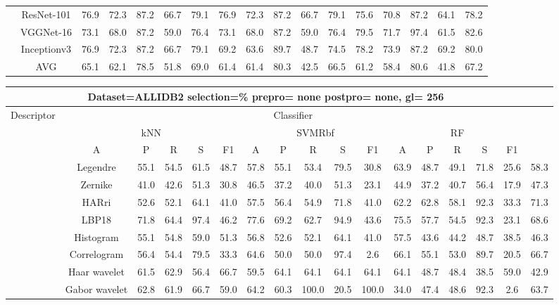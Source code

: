 \documentclass[12pt,italian]{article}
\begin{document}
\begin{tiny}
\begin{longtable}{lcccccccccccccccc}
& ResNet-101 & 76.9 & 72.3 & 87.2 & 66.7 & 79.1 & 76.9 & 72.3 & 87.2 & 66.7 & 79.1 & 75.6 & 70.8 & 87.2 & 64.1 & 78.2 \\ 
& VGGNet-16 & 73.1 & 68.0 & 87.2 & 59.0 & 76.4 & 73.1 & 68.0 & 87.2 & 59.0 & 76.4 & 79.5 & 71.7 & 97.4 & 61.5 & 82.6 \\ 
& Inceptionv3 & 76.9 & 72.3 & 87.2 & 66.7 & 79.1 & 69.2 & 63.6 & 89.7 & 48.7 & 74.5 & 78.2 & 73.9 & 87.2 & 69.2 & 80.0 \\ 
\hline
& AVG & 65.1 & 62.1 & 78.5 & 51.8 & 69.0 & 61.4 & 61.4 & 80.3 & 42.5 & 66.5 & 61.2 & 58.4 & 80.6 & 41.8 & 67.2 \\ 
\hline
\bottomrule
\end{longtable} 

 \pagebreak 
\begin{longtable}{lcccccccccccccccc}
\toprule
\multicolumn{16}{c}{Dataset=ALLIDB2 selection=\% prepro= none postpro= none, gl= 256} \\ 
\toprule
Descriptor & \multicolumn{15}{c}{Classifier} \\ 
& \multicolumn{5}{c}{kNN} & \multicolumn{5}{c}{SVMRbf} & \multicolumn{5}{c}{RF} \\ 
& A & P & R & S & F1 & A & P & R & S & F1 & A & P & R & S & F1 \\ 
\midrule
& Legendre & 55.1 & 54.5 & 61.5 & 48.7 & 57.8 & 55.1 & 53.4 & 79.5 & 30.8 & 63.9 & 48.7 & 49.1 & 71.8 & 25.6 & 58.3 \\ 
& Zernike & 41.0 & 42.6 & 51.3 & 30.8 & 46.5 & 37.2 & 40.0 & 51.3 & 23.1 & 44.9 & 37.2 & 40.7 & 56.4 & 17.9 & 47.3 \\ 
& HARri & 52.6 & 52.1 & 64.1 & 41.0 & 57.5 & 56.4 & 54.9 & 71.8 & 41.0 & 62.2 & 62.8 & 58.1 & 92.3 & 33.3 & 71.3 \\ 
& LBP18 & 71.8 & 64.4 & 97.4 & 46.2 & 77.6 & 69.2 & 62.7 & 94.9 & 43.6 & 75.5 & 57.7 & 54.5 & 92.3 & 23.1 & 68.6 \\ 
& Histogram & 55.1 & 54.8 & 59.0 & 51.3 & 56.8 & 52.6 & 52.1 & 64.1 & 41.0 & 57.5 & 43.6 & 44.2 & 48.7 & 38.5 & 46.3 \\ 
& Correlogram & 56.4 & 54.4 & 79.5 & 33.3 & 64.6 & 50.0 & 50.0 & 97.4 &  2.6 & 66.1 & 55.1 & 53.0 & 89.7 & 20.5 & 66.7 \\ 
& Haar wavelet & 61.5 & 62.9 & 56.4 & 66.7 & 59.5 & 64.1 & 64.1 & 64.1 & 64.1 & 64.1 & 48.7 & 48.4 & 38.5 & 59.0 & 42.9 \\ 
& Gabor wavelet & 62.8 & 61.9 & 66.7 & 59.0 & 64.2 & 60.3 & 100.0 & 20.5 & 100.0 & 34.0 & 47.4 & 48.6 & 92.3 &  2.6 & 63.7 \\ 

\end{longtable}
\end{tiny}
\end{document}
